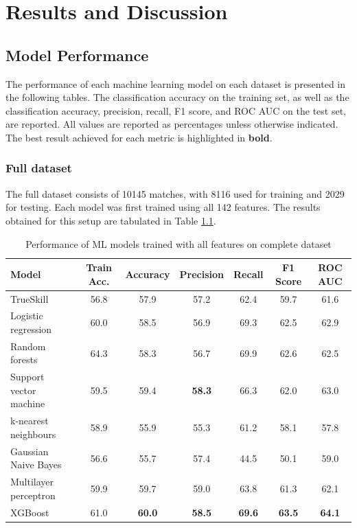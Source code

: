\chapter{Results and Discussion}
\label{Results}

\section{Model Performance}

The performance of each machine learning model on each dataset is presented in the following tables. The classification accuracy on the training set, as well as the classification accuracy, precision, recall, F1 score, and ROC AUC on the test set, are reported. All values are reported as percentages unless otherwise indicated. The best result achieved for each metric is highlighted in \textbf{bold}.

\subsection{Full dataset}

The full dataset consists of 10145 matches, with 8116 used for training and 2029 for testing. Each model was first trained using all 142 features. The results obtained for this setup are tabulated in Table \ref{table:1}.

\begin{table}[h!]
	\centering
	\small
	\begin{adjustbox}{center} %
		\begin{tabular}{ |l|c|c|c|c|c|c| }
			\hline
			\rule{0pt}{2.6ex} \textbf{Model} & \textbf{Train Acc.} & \textbf{Accuracy} & \textbf{Precision} & \textbf{Recall} & \textbf{F1 Score} & \textbf{ROC AUC} \\
			\hline
			\rule{0pt}{2.6ex} TrueSkill                 & 56.8 & 57.9 & 57.2 & 62.4 & 59.7 & 61.6 \\ \hline
			\rule{0pt}{2.6ex} Logistic regression 		& 60.0 & 58.5 & 56.9 & 69.3 & 62.5 & 62.9 \\
			\rule{0pt}{2.6ex} Random forests 			& 64.3 & 58.3 & 56.7 & 69.9 & 62.6 & 62.5 \\
			\rule{0pt}{2.6ex} Support vector machine 	& 59.5 & 59.4 & \textbf{58.3} & 66.3 & 62.0 & 63.0 \\
			\rule{0pt}{2.6ex} k-nearest neighbours 		& 58.9 & 55.9 & 55.3 & 61.2 & 58.1 & 57.8 \\
			\rule{0pt}{2.6ex} Gaussian Naive Bayes 		& 56.6 & 55.7 & 57.4 & 44.5 & 50.1 & 59.0 \\
			\rule{0pt}{2.6ex} Multilayer perceptron     & 59.9 & 59.7 & 59.0 & 63.8 & 61.3 & 62.1 \\
			\rule{0pt}{2.6ex} XGBoost 					& 61.0 & \textbf{60.0} & \textbf{58.5} &\textbf{ 69.6} & \textbf{63.5} & \textbf{64.1} \\
			\hline
		\end{tabular}
	\end{adjustbox}
	\caption{Performance of ML models trained with all features on complete dataset}
	\label{table:1}
\end{table}

